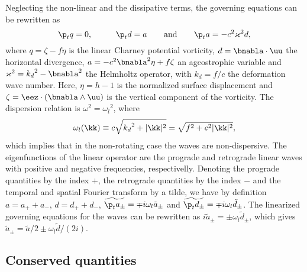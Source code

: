 Neglecting the non-linear and the dissipative terms, the governing
equations can be rewritten as
\begin{equation}
\p_t q = 0, \mbox{\hspace{1cm}} 
\p_t d = a \mbox{\hspace{6mm} and \hspace{6mm}} 
\p_t a = - c^2\varkappa^2 d, 
\end{equation}
where $q = \zeta - f\eta$ is the linear Charney potential vorticity, %
$d = \bnabla \cdot \uu$ the horizontal divergence, %
$a = -c^2\bnabla^2 \eta + f\zeta$ an ageostrophic variable and %
$\varkappa^2 = {k_d}^2 - \bnabla^2$ the Helmholtz operator, %
with $k_d = f/c$ the deformation wave number. %
Here, $\eta = h-1$ is the normalized surface displacement and %
$\zeta = \eez \cdot (\bnabla \wedge \uu)$ is the vertical component of
the vorticity.
%
The dispersion relation is $\omega^2 = {\omega_l}^2$, where
\begin{equation}
 \omega_l(\kk) \equiv c  \sqrt{ {k_d}^2 + |\kk|^2 } = \sqrt{ f^2 + c^2|\kk|^2 },
\end{equation}
which implies that in the non-rotating case the waves are
non-dispersive.
%
The eigenfunctions of the linear operator are the prograde and
retrograde linear waves with positive and negative frequencies,
respectivelly.
%
Denoting the prograde quantities by the index $+$, the retrograde
quantities by the index $-$ and the temporal and spatial Fourier
transform by a tilde, we have by definition %
$a = a_+ + a_-$, $d = d_+ + d_-$, %
$\widetilde{\p_t a_\pm} = \mp i \omega_l \tilde a_\pm$ and %
$\widetilde{\p_t d_\pm} = \mp i \omega_l \tilde d_\pm$.
%
The linearized governing equations for the waves can be rewritten as %
$i \tilde a_\pm = \pm \omega_l \tilde d_\pm$, which gives %
$ \tilde a_\pm = \tilde a /2 \pm \omega_l \tilde d /(2i) .$




\subsection{Conserved quantities}


